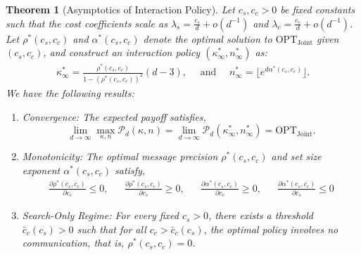 \documentclass[12pt]{article}
\newtheorem{theorem}{Theorem}
\theoremstyle{definition}
\theoremstyle{remark}
\begin{document}
\begin{theorem}[Asymptotics of Interaction Policy]
\label{thm:asym_opt}
Let $c_s, c_c > 0$ be fixed constants such that the cost coefficients scale as $\lambda_s = \frac{c_s}{d} + o(d^{-1})$ and $\lambda_c = \frac{c_c}{d} + o(d^{-1})$. Let $\rho^*(c_s, c_c)$ and $\alpha^*(c_s,c_c)$ denote the optimal solution to $\mathrm{OPT}_{\mathrm{Joint}}$ given $(c_s, c_c)$, and construct an interaction policy $(\kappa^*_\infty, n^*_\infty)$ as:
\begin{align}
\label{eq:high_dim_interaction_policy}
    \kappa^*_\infty =  \frac{\rho^*(c_s,c_c)}{1-(\rho^*(c_s,c_c))^2} (d-3), \quad \text{ and } \quad n^*_\infty = \lfloor e^{d \alpha^*(c_s,c_c)} \rfloor.
\end{align}
We have the following results:
\begin{enumerate}
    \item \emph{Convergence:} The expected payoff satisfies,
    \begin{equation*}
        \lim_{d\rightarrow \infty} \max_{\kappa , n} \mathcal{P}_d(\kappa,n) = \lim_{d \rightarrow \infty} \mathcal{P}_d(\kappa^*_\infty,n^*_\infty) = \mathrm{OPT}_{\mathrm{Joint}}.
    \end{equation*}
    \item \emph{Monotonicity:} The optimal message precision $\rho^*(c_s, c_c)$ and set size exponent $\alpha^*(c_s,c_c)$ satisfy,
    \begin{align*}
        \frac{\partial \rho^*(c_s, c_c)}{ \partial c_c} \leq 0, &&  \frac{\partial \rho^*(c_s, c_c)}{ \partial c_s} \geq 0, && \frac{\partial \alpha^*(c_s, c_c)}{ \partial c_c} \geq 0, && \frac{\partial \alpha^*(c_s, c_c)}{ \partial c_s} \leq 0
    \end{align*}
    \item \emph{Search-Only Regime:} For every fixed $c_s>0$, there exists a threshold $\bar{c}_c(c_s) > 0$ such that for all $c_c > \bar{c}_c(c_s)$, the optimal policy involves no communication, that is, $\rho^*(c_s, c_c)=0$.
\end{enumerate}
\end{theorem}
\end{document}
